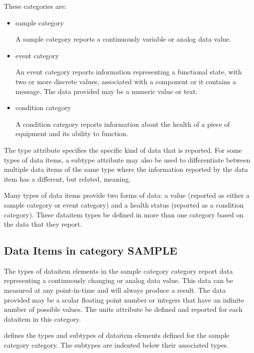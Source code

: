 These categories are:

\begin{itemize}

\item \gls{sample category}

A \gls{sample category} reports a continuously variable or analog data value. 

\item \gls{event category}

An \gls{event category} reports information representing a functional state, with two or more discrete values, associated with a component or it contains a message.  The data provided may be a numeric value or text.

\item \gls{condition category}

A \gls{condition category} reports information about the health of a piece of equipment and its ability to function.
\end{itemize}

The \gls{type} attribute specifies the specific kind of data that is reported.   For some types of data items, a \gls{subtype} attribute may also be used to differentiate between multiple data items of the same \gls{type} where the information reported by the data item has a different, but related, meaning.

Many types of data items provide two forms of data: a value (reported as either a \gls{sample category} or \gls{event category}) and a health status (reported as a \gls{condition category}).  These \gls{dataitem} types \may be defined in more than one \gls{category} based on the data that they report.

\newpage

\subsection{Data Items in category SAMPLE}

The types of \gls{dataitem} elements in the \gls{sample category} category report data representing a continuously changing or analog data value.  This data can be measured at any point-in-time and will always produce a result.  The data provided may be a scalar floating point number or integers that have an infinite number of possible values.  The \gls{units} attribute \must be defined and reported for each \gls{dataitem} in this category.

 defines the types and subtypes of \gls{dataitem} elements defined for the \gls{sample category} category.  The subtypes are indented below their associated types. 

